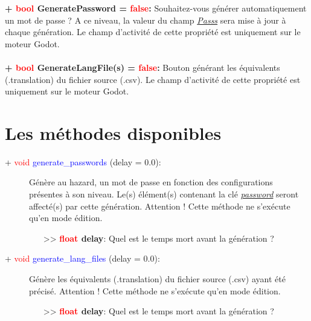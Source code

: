 \documentclass[a4paper, 11pt]{article}
\begin{document}
	\textbf{+ \textcolor{red}{bool} \hypertarget{genpass}{GeneratePassword} = \textcolor{red}{false}:}
	Souhaitez-vous générer automatiquement un mot de passe ? A ce niveau, la valeur du champ
	\textit{\hyperlink{pass}{Passs}} sera mise à jour à chaque génération. Le champ d'activité de cette
	propriété est uniquement sur le moteur Godot.\\\\
	\textbf{+ \textcolor{red}{bool} \hypertarget{genlangfile}{GenerateLangFile(s)} = \textcolor{red}
	{false}:} Bouton générant les équivalents (.translation) du fichier source (.csv). Le champ d'activité
	de cette propriété est uniquement sur le moteur Godot.

	\section{Les méthodes disponibles}
	\begin{description}
		\item [+ \textcolor{red}{void} \textcolor{blue}{generate\_passwords} (delay = 0.0):] Génère au 
		hazard, un mot de passe en fonction des configurations présentes à son niveau. Le(s) élément(s) 
		contenant la clé \textit{\hyperlink{pass}{password}} seront affecté(s) par cette génération.
		Attention ! Cette méthode ne s'exécute qu'en mode édition.
		\begin{itemize}
			\item [>> \textbf{\textcolor{red}{float} delay}:] Quel est le temps mort avant la génération ?\\
		\end{itemize}
	\end{description}
	\begin{description}
		\item [+ \textcolor{red}{void} \textcolor{blue}{generate\_lang\_files} (delay = 0.0):] Génère les 
		équivalents (.translation) du fichier source (.csv) ayant été précisé. Attention ! Cette méthode ne
		s'exécute qu'en mode édition.
		\begin{itemize}
			\item [>> \textbf{\textcolor{red}{float} delay}:] Quel est le temps mort avant la génération ?\\
		\end{itemize}
	\end{description}
\end{document}
